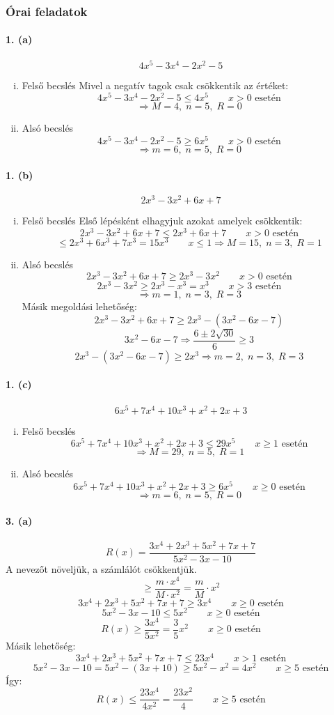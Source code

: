 \documentclass[12pt,a4paper,fleqn]{article}
\newcommand{\myparagraph}[1]{\paragraph{#1}\mbox{}}
\begin{document}
\subsubsection{Órai feladatok}

\myparagraph{1. (a)}
\[ 4x^5 - 3x^4 - 2x^2 - 5 \]
\begin{enumerate}[i.]
  \item Felső becslés
  Mivel a negatív tagok csak csökkentik az értéket:
  \[ 4x^5 - 3x^4 - 2x^2 - 5 \leq 4x^5 \qquad x > 0 \text{ esetén} \]
  \[ \Rightarrow M = 4,\; n = 5,\; R = 0 \]
  \item Alsó becslés
  \[ 4x^5 - 3x^4 - 2x^2 - 5 \geq 6x^5 \qquad x > 0 \text{ esetén} \]
  \[ \Rightarrow m = 6,\; n = 5,\; R = 0 \]
\end{enumerate}

\myparagraph{1. (b)}
\[ 2x^3 - 3x^2 + 6x + 7 \]
\begin{enumerate}[i.]
  \item Felső becslés
  Első lépésként elhagyjuk azokat amelyek csökkentik:
  \[ 2x^3 - 3x^2 + 6x + 7 \leq 2x^3 + 6x + 7 \qquad x > 0 \text{ esetén} \]
  \[ \leq 2x^3+6x^3+7x^3 = 15x^3 \qquad x \leq 1 \Rightarrow M = 15,\; n = 3,\;
    R = 1 \]
  \item Alsó becslés
  \[ 2x^3 - 3x^2 + 6x + 7 \geq 2x^3 - 3x^2 \qquad x > 0 \text{ esetén} \]
  \[ 2x^3 - 3x^2 \geq 2x^3 - x^3 = x^3 \qquad x > 3 \text{ esetén} \]
  \[ \Rightarrow m = 1,\; n = 3,\; R = 3 \]
  Másik megoldási lehetőség:
  \[ 2x^3 - 3x^2 + 6x + 7 \geq 2x^3 - (3x^2 - 6x - 7) \]
  \[ 3x^2 - 6x - 7 \Rightarrow \dfrac{6 \pm 2\sqrt{30}}{6} \geq 3\]
  \[ 2x^3 - (3x^2 - 6x - 7) \geq 2x^3 \Rightarrow m = 2,\; n = 3,\; R = 3 \]
\end{enumerate}

\myparagraph{1. (c)}
\[ 6x^5 + 7x^4 + 10x^3 + x^2 + 2x + 3 \]
\begin{enumerate}[i.]
  \item Felső becslés
  \[ 6x^5 + 7x^4 + 10x^3 + x^2 + 2x + 3 \leq 29x^5 \qquad x \geq 1 \text{ esetén}\]
  \[ \Rightarrow M = 29,\; n = 5,\; R = 1 \]
  \item Alsó becslés
  \[ 6x^5 + 7x^4 + 10x^3 + x^2 + 2x + 3 \geq 6x^5 \qquad x \geq 0 \text{ esetén}\]
  \[ \Rightarrow m = 6,\; n = 5,\; R = 0 \]
\end{enumerate}

\myparagraph{3. (a)}
\[ R(x) = \dfrac{3x^4 + 2x^3 + 5x^2 + 7x + 7}{5x^2 - 3x -10} \]
A nevezőt növeljük, a számlálót csökkentjük.
\[ \geq \dfrac{m \cdot x^4}{M \cdot x^2} = \dfrac{m}{M} \cdot x^2\]
\[ 3x^4 + 2x^3 + 5x^2 + 7x + 7 \geq 3x^4 \qquad x \geq 0 \text{ esetén} \]
\[ 5x^2 - 3x -10 \leq 5x^2 \qquad x \geq 0 \text{ esetén} \]
\[ R(x) \geq \dfrac{3x^4}{5x^2} = \dfrac{3}{5}x^2 \qquad x \geq 0
  \text{ esetén} \]
Másik lehetőség:
\[ 3x^4 + 2x^3 + 5x^2 + 7x + 7 \leq 23x^4 \qquad x > 1 \text{ esetén} \]
\[ 5x^2 - 3x -10 = 5x^2 -(3x + 10) \geq 5x^2-x^2 = 4x^2 \qquad x \geq 5
  \text{ esetén} \]
Így:
\[ R(x) \leq \dfrac{23x^4}{4x^2} = \dfrac{23x^2}{4} \qquad x \geq 5
  \text{ esetén} \]
\end{document}
